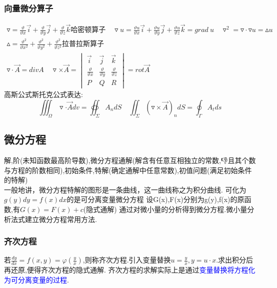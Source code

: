 \documentclass[10pt, a4paper, oneside]{ctexart}
\begin{document}
\begin{sloppypar}
	\subsubsection{向量微分算子}
	\begin{gather*}
		\triangledown = \frac{\vartheta }{\vartheta x}\overrightarrow{i}+\frac{\vartheta }{\vartheta y}\overrightarrow{j}+\frac{\vartheta }{\vartheta z}\overrightarrow{k}\text{哈密顿算子}\quad
		\triangledown u = \frac{\vartheta u}{\vartheta x}\overrightarrow{i}+\frac{\vartheta u}{\vartheta y}\overrightarrow{j}+\frac{\vartheta u}{\vartheta z}\overrightarrow{k} = grad \  u \quad \triangledown^2 = \triangledown \cdot \triangledown u = \vartriangle u
		\\
		\vartriangle = \frac{\vartheta^2}{\vartheta x^2} + \frac{\vartheta^2}{\vartheta y^2}+\frac{\vartheta^2}{\vartheta z^2}\text{拉普拉斯算子}\\
		\triangledown \cdot \overrightarrow{A} = div A \quad \triangledown \times \overrightarrow{A} = \begin{vmatrix}
			\overrightarrow{i}            & \overrightarrow{j}            & \overrightarrow{k}            \\
			\frac{\vartheta}{\vartheta x} & \frac{\vartheta}{\vartheta y} & \frac{\vartheta}{\vartheta z} \\
			P                             & Q                             & R
		\end{vmatrix} = rot \overrightarrow{A}
	\end{gather*}
	高斯公式斯托克公式表达:$$
		\iiint_\Omega \triangledown \cdot \overrightarrow{A}dv = \oiint_\Sigma A_n dS \quad \iint_\Sigma (\triangledown\times\overrightarrow{A})_n dS = \oint_\Gamma A_t ds
	$$
	\subsection{微分方程}
	解,阶(未知函数最高阶导数),微分方程通解(解含有任意互相独立的常数,👎且其个数与方程的阶数相同),初始条件,特解(确定通解中任意常数),初值问题(满足初始条件的特解)\\一般地讲，微分方程特解的图形是一条曲线，这一曲线称之为积分曲线.
	可化为$g(y)dy = f(x)dx$的是可分离变量微分方程
	设G(x),F(x)分别为g(y),f(x)的原函数,有$G(x)=F(x)+c$(隐式通解)
	通过对微小量的分析得到微分方程.微小量分析法式建立微分方程常用方法.

	\subsubsection{齐次方程}
	若$\frac{dy}{dx}=f(x,y)=\varphi(\frac{y}{x})$,则称齐次方程.引入变量替换$u=\frac{y}{x}, y= u \cdot x$.求出积分后再还原,便得齐次方程的隐式通解.	齐次方程的求解实际上是通过\textcolor{blue}{变量替换将方程化为可分离变量的过程}.

\end{sloppypar}
\end{document}
